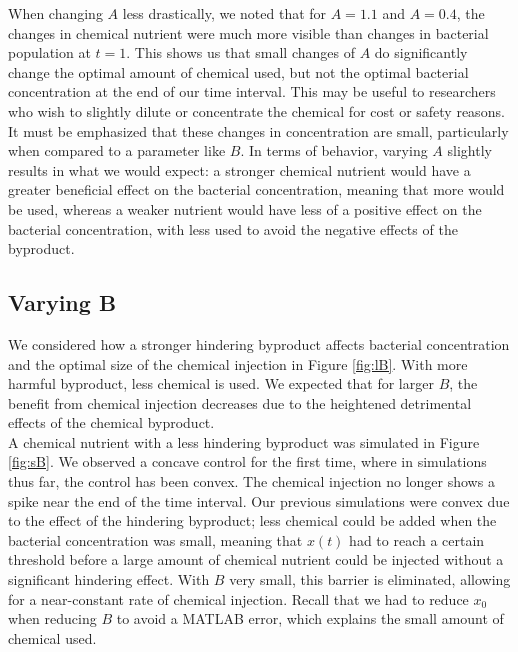 \documentclass[10pt]{article}
\theoremstyle{exmp}
\begin{document}
\noindent When changing $A$ less drastically, we noted that for $A = 1.1$ and $A = 0.4$, the changes in chemical nutrient were much more visible than changes in bacterial population at $t = 1$. This shows us that small changes of $A$ do significantly change the optimal amount of chemical used, but not the optimal bacterial concentration at the end of our time interval. This may be useful to researchers who wish to slightly dilute or concentrate the chemical for cost or safety reasons. It must be emphasized that these changes in concentration are small, particularly when compared to a parameter like $B$. In terms of behavior, varying $A$ slightly results in what we would expect: a stronger chemical nutrient would have a greater beneficial effect on the bacterial concentration, meaning that more would be used, whereas a weaker nutrient would have less of a positive effect on the bacterial concentration, with less used to avoid the negative effects of the byproduct.\\

\subsection{Varying B}

\noindent We considered how a stronger hindering byproduct affects bacterial concentration and the optimal size of the chemical injection in Figure \ref{fig:lB}. With more harmful byproduct, less chemical is used. We expected that for larger $B$, the benefit from chemical injection decreases due to the heightened detrimental effects of the chemical byproduct. \\

\noindent A chemical nutrient with a less hindering byproduct was simulated in Figure \ref{fig:sB}. We observed a concave control for the first time, where in simulations thus far, the control has been convex. The chemical injection no longer shows a spike near the end of the time interval. Our previous simulations were convex due to the effect of the hindering byproduct; less chemical could be added when the bacterial concentration was small, meaning that $x(t)$ had to reach a certain threshold before a large amount of chemical nutrient could be injected without a significant hindering effect. With $B$ very small, this barrier is eliminated, allowing for a near-constant rate of chemical injection. Recall that we had to reduce $x_0$ when reducing $B$ to avoid a MATLAB error, which explains the small amount of chemical used. \\
\end{document}
